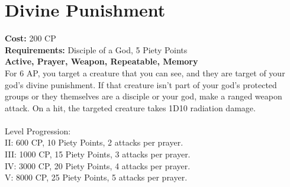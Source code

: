 \section{Divine Punishment}
\textbf{Cost:} 200 CP\\
\textbf{Requirements:} Disciple of a God, 5 Piety Points \\
\textbf{Active, Prayer, Weapon, Repeatable, Memory}\\
For 6 AP, you target a creature that you can see, and they are target of your god's divine punishment. If that creature isn't part of your god's protected groups or they themselves are a disciple or your god, make a ranged weapon attack. On a hit, the targeted creature takes 1D10 radiation damage.\\
\\
Level Progression:\\
II: 600 CP, 10 Piety Points, 2 attacks per prayer.\\
III: 1000 CP, 15 Piety Points, 3 attacks per prayer.\\
IV: 3000 CP, 20 Piety Points, 4 attacks per prayer.\\
V: 8000 CP, 25 Piety Points, 5 attacks per prayer.\\